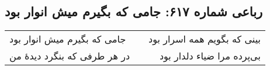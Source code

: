 \begin{center}
\section*{رباعی شماره ۶۱۷: جامی که بگیرم میش انوار بود}
\label{sec:0617}
\begin{longtable}{l p{0.5cm} r}
جامی که بگیرم میش انوار بود
&&
بینی که بگویم همه اسرار بود
\\
در هر طرفی که بنگرد دیدهٔ من
&&
بی‌پرده مرا ضیاء دلدار بود
\\
\end{longtable}
\end{center}
